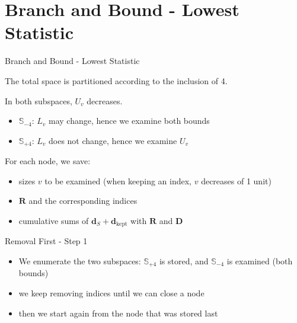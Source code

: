 \documentclass[aspectratio=169]{beamer}
\begin{document}
\section{Branch and Bound - Lowest Statistic}

\begin{frame}{Branch and Bound - Lowest Statistic}

The total space is partitioned according to the inclusion of 4.

\vspace{3mm}
In both subspaces, $U_v$ decreases.
\begin{itemize}
\item $\mathbb{S}_{-4}$: $L_v$ may change, hence we examine both bounds
\item $\mathbb{S}_{+4}$: $L_v$ does not change, hence we examine $U_v$
\end{itemize}

\vspace{3mm}
For each node, we save:
\begin{itemize}
\item sizes $v$ to be examined (when keeping an index, $v$ decreases of 1 unit)
\item $\mathbf{R}$ and the corresponding indices
\item cumulative sums of $\mathbf{d}_S + \mathbf{d}_{\text{kept}}$ with $\mathbf{R}$ and $\mathbf{D}$
\end{itemize}
\end{frame}



\begin{frame}{Removal First - Step 1}
\begin{itemize}
\item We enumerate the two subspaces: $\mathbb{S}_{+4}$ is stored, and $\mathbb{S}_{-4}$ is examined (both bounds)
\item we keep removing indices until we can close a node
\item then we start again from the node that was stored last
\end{itemize}

\vspace{3mm}
\begin{figure}[h!]
\centering
{}
\end{figure}
\end{frame}
\end{document}
